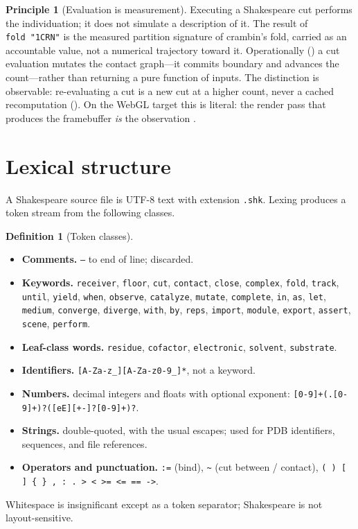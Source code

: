 \documentclass[11pt,a4paper]{article}
\theoremstyle{thmstyle}
\theoremstyle{definition}
\newtheorem{definition}[theorem]{Definition}
\newtheorem{principle}[theorem]{Principle}
\theoremstyle{remark}
\newcommand{\shk}[1]{\texttt{#1}}
\begin{document}
\begin{principle}[Evaluation is measurement]
\label{prin:measure}
Executing a Shakespeare cut performs the individuation; it does not
simulate a description of it. The result of \shk{fold\ "1CRN"} is the
measured partition signature of crambin's fold, carried as an accountable
value, not a numerical trajectory toward it. Operationally
() a cut evaluation mutates the contact graph---it commits
boundary and advances the count---rather than returning a pure function of
inputs. The distinction is observable: re-evaluating a cut is a new cut at
a higher count, never a cached recomputation (). On the
WebGL target this is literal: the render pass that produces the framebuffer
\emph{is} the observation \citep{sachikonye2025sbs}.
\end{principle}

\section{Lexical structure}
\label{sec:lexical}

A Shakespeare source file is UTF-8 text with extension \shk{.shk}. Lexing
produces a token stream from the following classes.

\begin{definition}[Token classes]
\label{def:tokens}
\leavevmode
\begin{itemize}[leftmargin=1.4em,itemsep=1pt]
\item \textbf{Comments.} \shk{--} to end of line; discarded.
\item \textbf{Keywords.} \shk{receiver}, \shk{floor}, \shk{cut},
\shk{contact}, \shk{close}, \shk{complex}, \shk{fold}, \shk{track},
\shk{until}, \shk{yield}, \shk{when}, \shk{observe}, \shk{catalyze},
\shk{mutate}, \shk{complete}, \shk{in}, \shk{as}, \shk{let},
\shk{medium}, \shk{converge}, \shk{diverge}, \shk{with}, \shk{by},
\shk{reps}, \shk{import}, \shk{module}, \shk{export}, \shk{assert},
\shk{scene}, \shk{perform}.
\item \textbf{Leaf-class words.} \shk{residue}, \shk{cofactor},
\shk{electronic}, \shk{solvent}, \shk{substrate}.
\item \textbf{Identifiers.} \shk{[A-Za-z\_][A-Za-z0-9\_]*}, not a keyword.
\item \textbf{Numbers.} decimal integers and floats with optional
exponent: \shk{[0-9]+(.[0-9]+)?([eE][+-]?[0-9]+)?}.
\item \textbf{Strings.} double-quoted, with the usual escapes; used for
PDB identifiers, sequences, and file references.
\item \textbf{Operators and punctuation.} \shk{:=} (bind), \shk{\~{}} (cut
between / contact), \shk{( ) [ ] \{ \} , : . > < >= <= == ->}.
\end{itemize}
Whitespace is insignificant except as a token separator; Shakespeare is
not layout-sensitive.
\end{definition}
\end{document}
